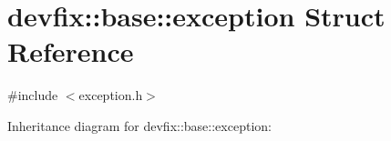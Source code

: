 \hypertarget{structdevfix_1_1base_1_1exception}{}\section{devfix\+:\+:base\+:\+:exception Struct Reference}
\label{structdevfix_1_1base_1_1exception}


{\ttfamily \#include $<$exception.\+h$>$}



Inheritance diagram for devfix\+:\+:base\+:\+:exception\+:
